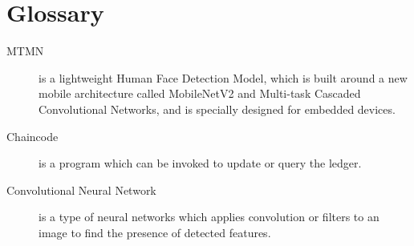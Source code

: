 \chapter*{Glossary}






\begin{description}
  \item[MTMN] is a lightweight Human Face Detection Model, which is built around a new mobile architecture called MobileNetV2 and Multi-task Cascaded Convolutional Networks, and is specially designed for embedded devices.
 \item[Chaincode] is a program which can be invoked to update or query the ledger.
  \item[Convolutional Neural Network] is a type of neural networks which applies convolution or filters to an image to find the presence of detected features.
 
\end{description}
